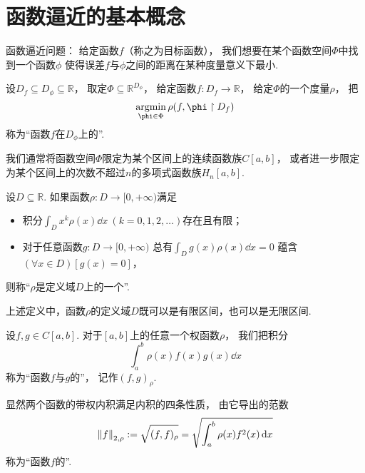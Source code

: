 \section{函数逼近的基本概念}
函数逼近问题：
给定函数\(f\)（称之为目标函数），
我们想要在某个函数空间\(\Phi\)中找到一个函数\(\phi\)
使得误差\(f\)与\(\phi\)之间的距离在某种度量意义下最小.
\begin{definition}
设\(D_f \subseteq D_\phi \subseteq \mathbb{R}\)，
取定\(\Phi \subseteq \mathbb{R}^{D_\phi}\)，
给定函数\(f\colon D_f \to \mathbb{R}\)，
给定\(\Phi\)的一个度量\(\rho\)，
把\begin{equation*}
	\argmin_{\phi \in \Phi} \rho(f,\phi \SetRestrict D_f)
\end{equation*}
称为“函数\(f\)在\(D_\phi\)上的”.
\end{definition}

我们通常将函数空间\(\Phi\)限定为某个区间上的连续函数族\(C[a,b]\)，
或者进一步限定为某个区间上的次数不超过\(n\)的多项式函数族\(H_n[a,b]\).

\begin{definition}
设\(D \subseteq \mathbb{R}\).
如果函数\(\rho\colon D \to [0,+\infty)\)满足\begin{itemize}
	\item 积分\(\int_D x^k \rho(x) \dd{x}\ (k=0,1,2,\dotsc)\)存在且有限；
	\item 对于任意函数\(g\colon D \to [0,+\infty)\)
	总有\(\int_D g(x) \rho(x) \dd{x} = 0\)
	蕴含\((\forall x \in D)[g(x) = 0]\)，
\end{itemize}
则称“\(\rho\)是定义域\(D\)上的一个”.
\end{definition}
\begin{remark}
上述定义中，函数\(\rho\)的定义域\(D\)既可以是有限区间，也可以是无限区间.
\end{remark}

\begin{definition}
设\(f,g \in C[a,b]\).
对于\([a,b]\)上的任意一个权函数\(\rho\)，
我们把积分\begin{equation*}
	\int_a^b \rho(x) f(x) g(x) \dd{x}
\end{equation*}
称为“函数\(f\)与\(g\)的”，
记作\((f,g)_\rho\).
\end{definition}

显然两个函数的带权内积满足内积的四条性质，
由它导出的范数\begin{equation*}
	\norm{f}_{2,\rho}
	:=
	\sqrt{(f,f)_\rho}
	= \sqrt{
		\int_a^b \rho(x) f^2(x) \dd{x}
	}
\end{equation*}
称为“函数\(f\)的”.
